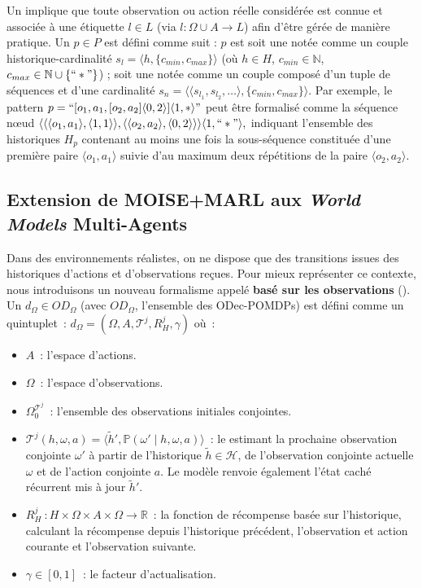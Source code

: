 Un  implique que toute observation ou action réelle considérée est connue et associée à une étiquette \(l \in L\) (via \(l: \Omega \cup A \to L\)) afin d'être gérée de manière pratique. Un  \(p \in P\) est défini comme suit : \(p\) est soit une  notée comme un couple historique-cardinalité \(s_l = \langle h, \{c_{min}, c_{max}\} \rangle\) (où \(h \in H\), \(c_{min} \in \mathbb{N}\), \(c_{max} \in \mathbb{N} \cup \{``*"\}\)) ; soit une  notée comme un couple composé d'un tuple de séquences et d'une cardinalité \(s_n = \langle \langle s_{l_1}, s_{l_2}, \dots \rangle, \{c_{min}, c_{max}\} \rangle\). Par exemple, le pattern
$
  p = ``[o_1,a_1,[o_2,a_2]\langle0,2\rangle]\langle1,*\rangle"
$
peut être formalisé comme la séquence nœud
$
  \langle \langle \langle o_1,a_1\rangle,\langle 1,1 \rangle \rangle, \langle \langle o_2,a_2\rangle,\langle 0,2 \rangle \rangle \rangle \langle 1,``*"\rangle,
$
indiquant l'ensemble des historiques \(H_p\) contenant au moins une fois la sous-séquence constituée d'une première paire \(\langle o_1,a_1\rangle\) suivie d'au maximum deux répétitions de la paire \(\langle o_2,a_2\rangle\).

\subsection{Extension de MOISE+MARL aux \textit{World Models} Multi-Agents}

\noindent Dans des environnements réalistes, on ne dispose que des transitions issues des historiques d'actions et d'observations reçues. Pour mieux représenter ce contexte, nous introduisons un nouveau formalisme appelé \textbf{ basé sur les observations} (). Un  $d_\Omega \in OD_\Omega$ (avec $OD_\Omega$, l'ensemble des ODec-POMDPs) est défini comme un quintuplet~:
%
$d_\Omega = \left(\Omega, A, \mathcal{T}^j, R^j_H, \gamma \right)$
%
où~:
\begin{itemize}
  \item $A$~: l'espace d'actions.
  \item $\Omega$~: l'espace d'observations.
  \item $\Omega^{\mathcal{T}^j}_0$~: l'ensemble des observations initiales conjointes.
  \item $\mathcal{T}^j(h, \omega, a) = \langle \tilde{h}', \mathbb{P}(\omega' \mid h, \omega, a) \rangle$~: le  estimant la prochaine observation conjointe $\omega'$ à partir de l'historique $\tilde{h} \in \mathcal{H}$, de l'observation conjointe actuelle $\omega$ et de l'action conjointe $a$. Le modèle renvoie également l'état caché récurrent mis à jour $\tilde{h}'$.
  \item $R^j_H~: H \times \Omega \times A \times \Omega \rightarrow \mathbb{R}$~: la fonction de récompense basée sur l'historique, calculant la récompense depuis l'historique précédent, l'observation et action courante et l'observation suivante.
  \item $\gamma \in [0, 1]$~: le facteur d'actualisation.
\end{itemize}

